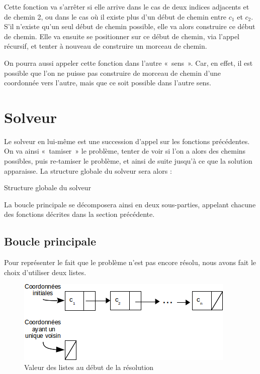 Cette fonction va s'arrêter si elle arrive dans le cas de deux indices adjacents et de chemin 2, ou dans le cas où il existe plus d'un début de chemin entre $c_1$ et $c_2$.
S'il n'existe qu'un seul début de chemin possible, elle va alors construire ce début de chemin. Elle va ensuite se positionner sur ce début de chemin, via l'appel récursif, et tenter à nouveau de construire un morceau de chemin.

On pourra aussi appeler cette fonction dans l'autre «~sens~». Car, en effet, il est possible que l'on ne puisse pas construire de morceau de chemin d'une coordonnée vers l'autre, mais que ce soit possible dans l'autre sens.

\section{Solveur}
  
Le solveur en lui-même est une succession d'appel sur les fonctions précédentes. On va ainsi «~tamiser~» le problème, tenter de voir si l'on a alors des chemins possibles, puis re-tamiser le problème, et ainsi de suite jusqu'à ce que la solution apparaisse. La structure globale du solveur sera alors :

\begin{algorithm}[H]
  \caption{Structure globale du solveur}
\end{algorithm}

La boucle principale se décomposera ainsi en deux sous-parties, appelant chacune des fonctions décrites dans la section précédente.

\subsection{Boucle principale}

Pour représenter le fait que le problème n'est pas encore résolu, nous avons fait le choix d'utiliser deux listes.

\begin{figure}[h]
      \centering
      \includegraphics[scale=0.5]{solveur-listes}
      \caption{Valeur des listes au début de la résolution}
\end{figure}

